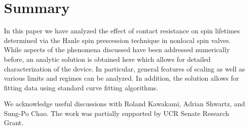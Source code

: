 \section{Summary}
\label{s:summary}

In this paper we have analyzed the effect of contact resistance
on spin lifetimes determined via the Hanle spin prescession technique in nonlocal spin valves.
While aspects of the phenomena discussed have been addressed numerically before,
an analytic solution is obtained here which allows for detailed characterization of the device.
In particular, general features of scaling as well as various limits and regimes can be analyzed.
In addition, the solution allows for fitting data using standard curve fitting algorithms.

We acknowledge useful discussions with Roland Kawakami, Adrian Shwartz, and Sung-Po Chao.
The work was partially supported by UCR Senate Research Grant.
